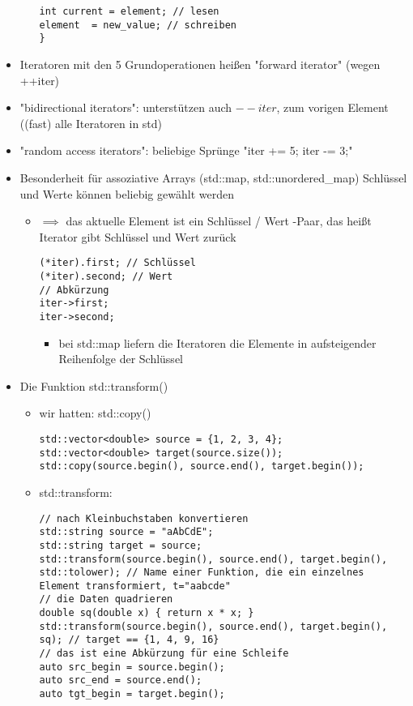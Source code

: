 \documentclass[a4paper]{scrartcl}
\theoremstyle{definition}
\theoremstyle{plain}
\theoremstyle{remark}
\theoremstyle{remark}
\begin{document}
\begin{itemize}
\begin{itemize}
\begin{verbatim}
int current = element; // lesen
element  = new_value; // schreiben
}
\end{verbatim}
\end{itemize}
\item Iteratoren mit den 5 Grundoperationen heißen "forward iterator" (wegen ++iter)
\item "bidirectional iterators": unterstützen auch $--iter$, zum vorigen Element ((fast) alle Iteratoren in std)
\item "random access iterators": beliebige Sprünge "iter += 5; iter -= 3;"
\item Besonderheit für assoziative Arrays (std::map, std::unordered\_map)
Schlüssel und Werte können beliebig gewählt werden
\begin{itemize}
\item $\implies$ das aktuelle Element ist ein Schlüssel / Wert -Paar, das heißt Iterator gibt Schlüssel und Wert zurück
\begin{verbatim}
(*iter).first; // Schlüssel
(*iter).second; // Wert
// Abkürzung
iter->first;
iter->second;
\end{verbatim}
\begin{itemize}
\item bei std::map liefern die Iteratoren die Elemente in aufsteigender Reihenfolge der Schlüssel
\end{itemize}
\end{itemize}
\item Die Funktion std::transform()
\begin{itemize}
\item wir hatten: std::copy()
\begin{verbatim}
std::vector<double> source = {1, 2, 3, 4};
std::vector<double> target(source.size());
std::copy(source.begin(), source.end(), target.begin());
\end{verbatim}
\item std::transform:
\begin{verbatim}
// nach Kleinbuchstaben konvertieren
std::string source = "aAbCdE";
std::string target = source;
std::transform(source.begin(), source.end(), target.begin(), std::tolower); // Name einer Funktion, die ein einzelnes Element transformiert, t="aabcde"
// die Daten quadrieren
double sq(double x) { return x * x; }
std::transform(source.begin(), source.end(), target.begin(), sq); // target == {1, 4, 9, 16}
// das ist eine Abkürzung für eine Schleife
auto src_begin = source.begin();
auto src_end = source.end();
auto tgt_begin = target.begin();


\end{verbatim}
\end{itemize}
\end{itemize}
\end{document}
